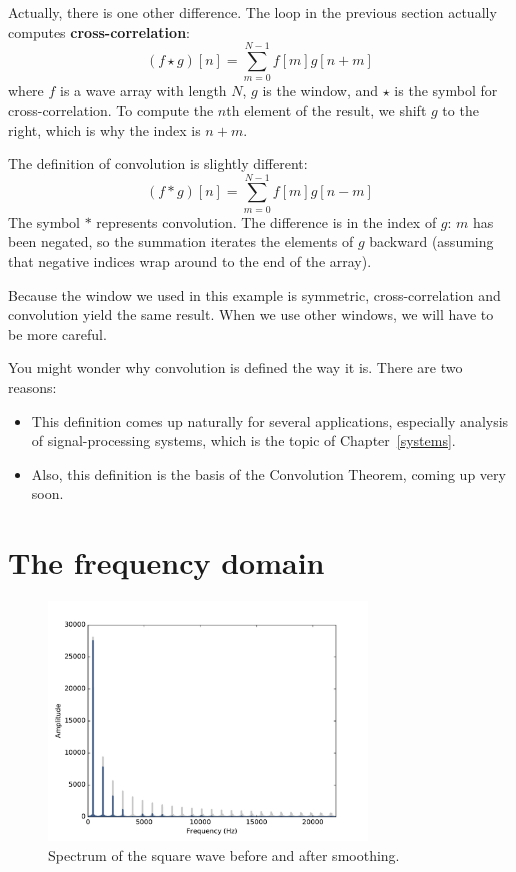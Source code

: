 \documentclass[12pt]{book}
\begin{document}
\newcommand{\conv}{\ast}

Actually, there is one other difference.  The loop in the
previous section actually computes {\bf cross-correlation}:
%
\[ (f \star g)[n] = \sum_{m=0}^{N-1} f[m] g[n+m]  \]
%
where $f$ is a wave array with length $N$, $g$ is the window,
and $\star$ is the symbol for cross-correlation.  To
compute the $n$th element of the result, we shift $g$ to
the right, which is why the index is $n+m$.

The definition of convolution is slightly different:
%
\[ (f \conv g)[n] = \sum_{m=0}^{N-1} f[m] g[n-m]  \]
%
The symbol $\conv$ represents convolution.  The difference is in the
index of $g$: $m$ has been negated, so the summation iterates the
elements of $g$ backward (assuming that negative indices wrap around
to the end of the array).

Because the window we used in this example is symmetric,
cross-correlation and convolution yield the same result.  When we use
other windows, we will have to be more careful.

You might wonder why convolution is defined the way it is.  There
are two reasons:

\begin{itemize}

\item This definition comes up naturally for several applications,
especially analysis of signal-processing systems, which is
the topic of Chapter~\ref{systems}.

\item Also, this definition is the basis of the Convolution Theorem,
coming up very soon.

\end{itemize}


\section{The frequency domain}

\begin{figure}
\centerline{\includegraphics[height=2.5in]{figs/convolution4.pdf}}
\caption{Spectrum of the square wave before and after smoothing.}
\label{fig.convolution4}
\end{figure}
\end{document}
